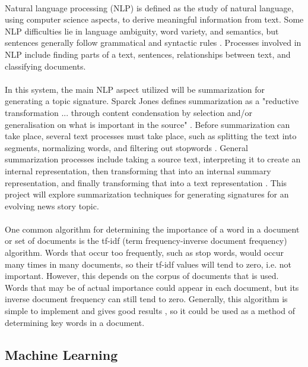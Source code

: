 \documentclass[11pt,titlepage]{report}
\begin{document}
\paragraph{}
Natural language processing (NLP) is defined as the study of natural language, using computer science aspects, to derive meaningful information from text. Some NLP difficulties lie in language ambiguity, word variety, and semantics, but sentences generally follow grammatical and syntactic rules \cite{nlp_java}. Processes involved in NLP include finding parts of a text, sentences, relationships between text, and classifying documents. 
\paragraph{}
In this system, the main NLP aspect utilized will be summarization for generating a topic signature. Sparck Jones defines summarization as a "reductive transformation ... through content condensation by selection and/or generalisation on what is important in the source" \cite{state_of_the_art}. Before summarization can take place, several text processes must take place, such as splitting the text into segments, normalizing words, and filtering out stopwords \cite{torres}. General summarization processes include taking a source text, interpreting it to create an internal representation, then transforming that into an internal summary representation, and finally transforming that into a text representation \cite{state_of_the_art}. This project will explore summarization techniques for generating signatures for an evolving news story topic.
\paragraph{}
One common algorithm for determining the importance of a word in a document or set of documents is the tf-idf (term frequency-inverse document frequency) algorithm. Words that occur too frequently, such as stop words, would occur many times in many documents, so their tf-idf values will tend to zero, i.e. not important. However, this depends on the corpus of documents that is used. Words that may be of actual importance could appear in each document, but its inverse document frequency can still tend to zero. Generally, this algorithm is simple to implement and gives good results \cite{torres}, so it could be used as a method of determining key words in a document.

\subsection{Machine Learning}
\end{document}
